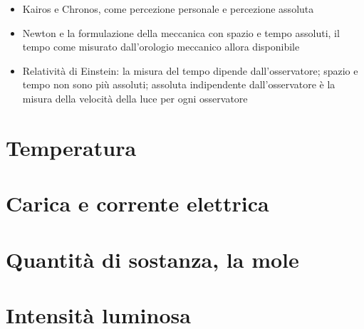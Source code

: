 \documentclass[letterpaper,10pt,italian]{jupyterBook}
\begin{document}
\sphinxAtStartPar
{}
\begin{itemize}
\item {} 
\sphinxAtStartPar
Kairos e Chronos, come percezione personale e percezione assoluta

\item {} 
\sphinxAtStartPar
Newton e la formulazione della meccanica con spazio e tempo assoluti, il tempo come misurato dall’orologio meccanico allora disponibile

\item {} 
\sphinxAtStartPar
Relatività di Einstein: la misura del tempo dipende dall’osservatore; spazio e tempo non sono più assoluti; assoluta \sphinxhyphen{} indipendente dall’osservatore \sphinxhyphen{} è la misura della velocità della luce per ogni osservatore

\end{itemize}

\sphinxstepscope


\section{Temperatura}
\label{\detokenize{ch/intro/physical_quantities-temperature:temperatura}}\label{\detokenize{ch/intro/physical_quantities-temperature:physics-hs-intro-physical-quantities-temperature}}\label{\detokenize{ch/intro/physical_quantities-temperature::doc}}
\sphinxstepscope


\section{Carica e corrente elettrica}
\label{\detokenize{ch/intro/physical_quantities-charge:carica-e-corrente-elettrica}}\label{\detokenize{ch/intro/physical_quantities-charge:physics-hs-intro-physical-quantities-charge}}\label{\detokenize{ch/intro/physical_quantities-charge::doc}}
\sphinxstepscope


\section{Quantità di sostanza, la mole}
\label{\detokenize{ch/intro/physical_quantities-mole:quantita-di-sostanza-la-mole}}\label{\detokenize{ch/intro/physical_quantities-mole:physics-hs-intro-physical-quantities-mole}}\label{\detokenize{ch/intro/physical_quantities-mole::doc}}
\sphinxstepscope


\section{Intensità luminosa}
\label{\detokenize{ch/intro/physical_quantities-luminosity:intensita-luminosa}}\label{\detokenize{ch/intro/physical_quantities-luminosity:physics-hs-intro-physical-quantities-luminosity}}\label{\detokenize{ch/intro/physical_quantities-luminosity::doc}}
\sphinxstepscope
\end{document}
